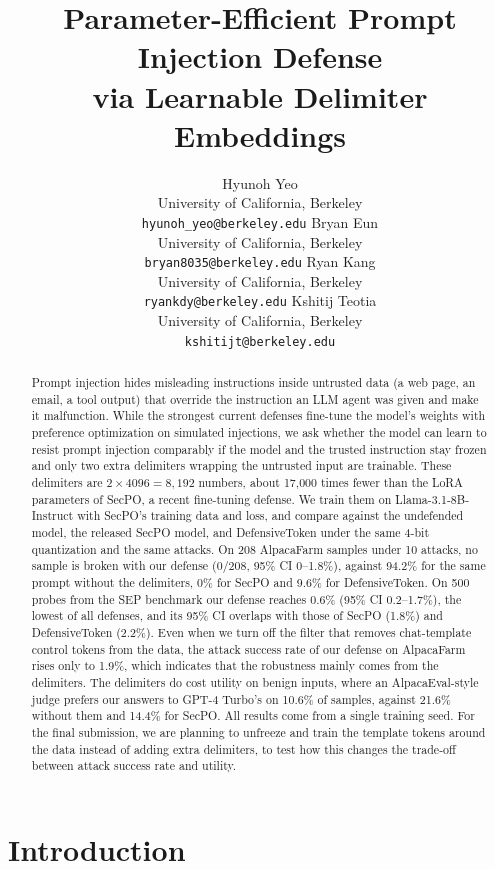 \documentclass{article}
\title{Parameter-Efficient Prompt Injection Defense\\via Learnable Delimiter Embeddings}
\author{%
  Hyunoh Yeo \\ University of California, Berkeley \\ \texttt{hyunoh\_yeo@berkeley.edu} \And
  Bryan Eun \\ University of California, Berkeley \\ \texttt{bryan8035@berkeley.edu} \AND
  Ryan Kang \\ University of California, Berkeley \\ \texttt{ryankdy@berkeley.edu} \And
  Kshitij Teotia \\ University of California, Berkeley \\ \texttt{kshitijt@berkeley.edu}
}
\begin{document}
\maketitle

\begin{abstract}
Prompt injection hides misleading instructions inside untrusted data (a web page, an email, a tool output) that override the instruction an LLM agent was given and make it malfunction. While the strongest current defenses fine-tune the model's weights with preference optimization on simulated injections, we ask whether the model can learn to resist prompt injection comparably if the model and the trusted instruction stay frozen and only two extra delimiters wrapping the untrusted input are trainable. These delimiters are $2 \times 4096 = 8{,}192$ numbers, about 17{,}000 times fewer than the LoRA parameters of SecPO, a recent fine-tuning defense. We train them on Llama-3.1-8B-Instruct with SecPO's training data and loss, and compare against the undefended model, the released SecPO model, and DefensiveToken under the same 4-bit quantization and the same attacks. On 208 AlpacaFarm samples under 10 attacks, no sample is broken with our defense (0/208, 95\% CI 0--1.8\%), against 94.2\% for the same prompt without the delimiters, 0\% for SecPO and 9.6\% for DefensiveToken. On 500 probes from the SEP benchmark our defense reaches 0.6\% (95\% CI 0.2--1.7\%), the lowest of all defenses, and its 95\% CI overlaps with those of SecPO (1.8\%) and DefensiveToken (2.2\%). Even when we turn off the filter that removes chat-template control tokens from the data, the attack success rate of our defense on AlpacaFarm rises only to 1.9\%, which indicates that the robustness mainly comes from the delimiters. The delimiters do cost utility on benign inputs, where an AlpacaEval-style judge prefers our answers to GPT-4 Turbo's on 10.6\% of samples, against 21.6\% without them and 14.4\% for SecPO. All results come from a single training seed. For the final submission, we are planning to unfreeze and train the template tokens around the data instead of adding extra delimiters, to test how this changes the trade-off between attack success rate and utility.
\end{abstract}

\section{Introduction}
\label{sec:intro}
\end{document}
